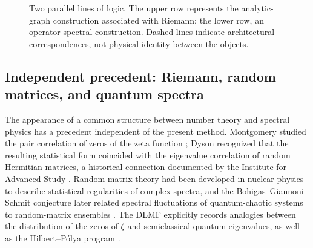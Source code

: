 \documentclass[11pt]{amsart}
\theoremstyle{definition}
\theoremstyle{remark}
\begin{document}
\begin{figure}[H]
\centering
{}
\caption{Two parallel lines of logic. The upper row represents the analytic-graph construction associated with Riemann; the lower row, an operator-spectral construction. Dashed lines indicate architectural correspondences, not physical identity between the objects.}
\label{fig:parallel-lines}
\end{figure}

\subsection{Independent precedent: Riemann, random matrices, and quantum spectra}
The appearance of a common structure between number theory and spectral physics has a precedent independent of the present method. Montgomery studied the pair correlation of zeros of the zeta function \cite{Montgomery1973}; Dyson recognized that the resulting statistical form coincided with the eigenvalue correlation of random Hermitian matrices, a historical connection documented by the Institute for Advanced Study \cite{IASDyson}. Random-matrix theory had been developed in nuclear physics to describe statistical regularities of complex spectra, and the Bohigas--Giannoni--Schmit conjecture later related spectral fluctuations of quantum-chaotic systems to random-matrix ensembles \cite{BGS1984}. The DLMF explicitly records analogies between the distribution of the zeros of $\zeta$ and semiclassical quantum eigenvalues, as well as the Hilbert--P\'olya program \cite{DLMFphysical}.
\end{document}
